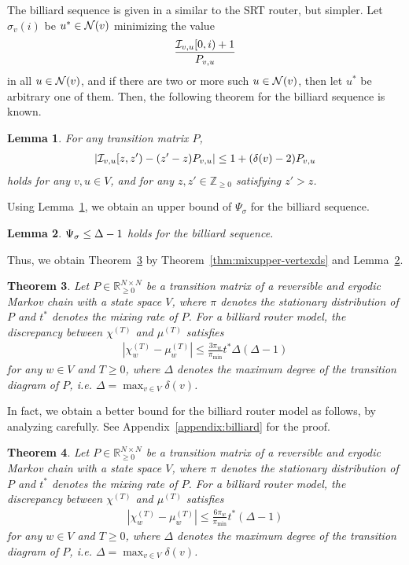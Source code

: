 \documentclass[letter, 11pt]{article}
\newcommand{\1}{\mbox{1}\hspace{-0.25em}\mbox{l}}
\newcommand{\I}{{\cal I}} \newcommand{\C}{{\cal C}} \newcommand{\dtv}{{\cal D}_{\rm tv}}
\newtheorem{theorem}{Theorem}[section]
\newtheorem{lemma}[theorem]{Lemma}
\begin{document}
The billiard sequence is given in a similar to the SRT router, but simpler. 
Let $\sigma_v(i)$ be $u^*\in {\cal N}(v)$ minimizing the value 
\begin{eqnarray*} 
\frac{\I_{v,u}[0,i)+1}{P_{v,u}}
\end{eqnarray*}
in all $u\in {\cal N}(v)$, and if there are two or more such $u\in {\cal N}(v)$, then let $u^*$ be arbitrary one of them. 
Then, the following theorem for the billiard sequence is known. 
\begin{lemma}\label{bound:billiardz}\cite{SMK04}
For any transition matrix $P$, 
\begin{eqnarray*}
\left| \I_{v, u}[z, z')-(z'-z)P_{v, u}\right|\leq 1+(\delta(v) -2)P_{v,u}
\end{eqnarray*}
 holds for any $v, u\in V$, and for any $z, z'\in \mathbb{Z}_{\geq 0}$ satisfying $z'>z$. 
\end{lemma}
Using Lemma~\ref{bound:billiardz}, we obtain an upper bound of $\Psi_\sigma$ for the billiard sequence. 
\begin{lemma}\label{bound:billiard}
$\Psi_\sigma \leq \Delta -1$ holds for the billiard sequence. 
\end{lemma}
Thus, we obtain Theorem~\ref{thm:mixupper-vertexbi}
  by Theorem~\ref{thm:mixupper-vertexds} and Lemma~\ref{bound:billiard}. 
\begin{theorem}
\label{thm:mixupper-vertexbi}
 Let $P \in \mathbb{R}_{\geq 0}^{N \times N}$ be a transition matrix of 
  a reversible and ergodic Markov chain with a state space $V$, where $\pi$ denotes the stationary distribution of $P$ and $t^*$ denotes the mixing rate of $P$. 
  For a billiard router model, the discrepancy between $\chi^{(T)}$ and $\mu^{(T)}$ satisfies
\begin{eqnarray*}
\left|\chi_w^{(T)}-\mu_w^{(T)}\right|
\leq \frac{3\pi_w}{\pi_{\min}} t^* \Delta(\Delta-1)
\end{eqnarray*}
  for any $w\in V$ and $T\geq 0$, where $\Delta$ denotes the maximum degree of the transition diagram of $P$, {\rm i.e.} $\Delta=\max_{v\in V}\delta(v)$. 
\end{theorem}
In fact, we obtain a better bound for the billiard router model as follows, by analyzing carefully. See Appendix~\ref{appendix:billiard} for the proof. 
\begin{theorem}
\label{thm:mixupper-vertexbi2}
 Let $P \in \mathbb{R}_{\geq 0}^{N \times N}$ be a transition matrix of 
  a reversible and ergodic Markov chain with a state space $V$, where $\pi$ denotes the stationary distribution of $P$ and $t^*$ denotes the mixing rate of $P$. 
  For a billiard router model, the discrepancy between $\chi^{(T)}$ and $\mu^{(T)}$ satisfies
\begin{eqnarray*}
\left|\chi_w^{(T)}-\mu_w^{(T)}\right|
\leq \frac{6\pi_w}{\pi_{\min}} t^* (\Delta-1)
\end{eqnarray*}
  for any $w\in V$ and $T\geq 0$, where $\Delta$ denotes the maximum degree of the transition diagram of $P$, {\rm i.e.} $\Delta=\max_{v\in V}\delta(v)$. 
\end{theorem}
\end{document}
